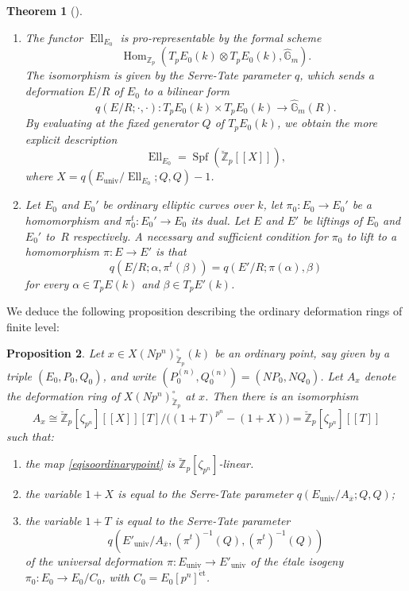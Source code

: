 \documentclass[JEP,XML,SOM,Unicode,published]{cedram}
\newenvironment{enumeratei}
{\bgroup\def\theenumi{\roman{enumi}}\def\theenumii{\arabic{enumii}}\begin{enumerate}}
{\end{enumerate}\egroup}
\newcommand{\lcr}{[\![}
\newcommand{\rcr}{]\!]}
\newcommand{\et}{\mathrm{\acute{e}t}}
\newcommand{\univ}{\mathrm{univ}}
\numberwithin{equation}{section}
\newtheorem{prop}{Proposition}[section]
\newtheorem{theo}[prop]{Theorem}
\theoremstyle{definition}
\newcommand{\bb}[1]{\mathbb{#1}}
\DeclareMathOperator{\Hom}{Hom}
\DeclareMathOperator{\Spf}{Spf}
\DeclareMathOperator{\Ell}{Ell}
\newcommand{\mc}[1]{X(Np^{#1})}
\begin{document}
\skpt
\begin{theo}[{\cite[Th.\,2.1]{katz1981serre}}]
\label{SerreTate}
\begin{enumerate}

\item
The functor $\Ell_{E_0}$ is pro-representable by the formal scheme
\[\Hom_{\bb{Z}_p}(T_pE_0(k)\otimes T_p E_0(k),\widehat{\bb{G}}_m).\]
The isomorphism is given by the Serre-Tate parameter $q$, which sends a deformation $E/R$ of $E_0$ to a bilinear form
\[
q(E/R; \cdot,\cdot): T_pE_0(k)\times T_p E_0(k)\to \widehat{\bb{G}}_m(R).
\]
By evaluating at the fixed generator $Q$ of $T_p E_0(k)$, we obtain the more explicit description
\[
\Ell_{E_0}=\Spf(\breve{\bb{Z}}_p\lcr X\rcr),
\]
where $X=q(E_{\univ}/\Ell_{E_0}; Q,Q)-1$.

\item

Let $E_0$ and $E_0'$ be ordinary elliptic curves over $k$, let $\pi_0: E_0\to E_0'$ be a homomorphism and $\pi_0^t: E_0' \to E_0$ its dual. Let $E$ and $E'$ be liftings of $E_0$ and $E_0'$ to~$R$ respectively. A necessary and sufficient condition for $\pi_0$ to lift to a homomorphism $\pi:E\to E'$ is that
\[
q(E/R;\alpha, \pi^t(\beta))=q(E'/R; \pi(\alpha), \beta)
\]
for every $\alpha\in T_pE(k)$ and $\beta\in T_p E'(k)$.
\end{enumerate}
\end{theo}

We deduce the following proposition describing the ordinary deformation rings of finite level:

\begin{prop}
\label{theodefringord}
Let $x\in \mc{n}_{\breve{\bb{Z}}_p}^{\circ}(k)$ be an ordinary point, say given by a triple $(E_0,P_0,Q_0)$, and write $(P_0^{(n)},Q_0^{(n)})=(NP_0, NQ_0)$. Let $A_{x}$ denote the deformation ring of $\mc{n}_{\breve{\bb{Z}}_p}^{\circ}$ at $x$. Then there is an isomorphism
\begin{equation}
\label{eqisoordinarypoint}
A_{x}\cong \breve{\bb{Z}}_p[\zeta_{p^n}]\lcr X\rcr[T]/\bigl((1+T)^{p^n}-(1+X)\bigr)= \breve{\bb{Z}}_p[\zeta_{p^n}]\lcr T\rcr
\end{equation}
such that:

\begin{enumeratei}
\item
the map \eqref{eqisoordinarypoint} is $\breve{\bb{Z}}_p[\zeta_{p^n}]$-linear.

\item
the variable $1+X$ is equal to the Serre-Tate parameter $q(E_{\univ}/A_{\overline{x}};Q,Q)$;

\item
the variable $1+T$ is equal to the Serre-Tate parameter
\[
q(E'_{\univ}/A_{\overline{x}}, (\pi^{t})^{-1}(Q), (\pi^{t})^{-1}(Q))
\]
of the universal deformation $\pi: E_{\univ}\to E'_{\univ}$ of the étale isogeny $\pi_0: E_0\to E_0/C_0$, with $C_0=E_0[p^n]^{\et}$.
\end{enumeratei}
\end{prop}
\end{document}
